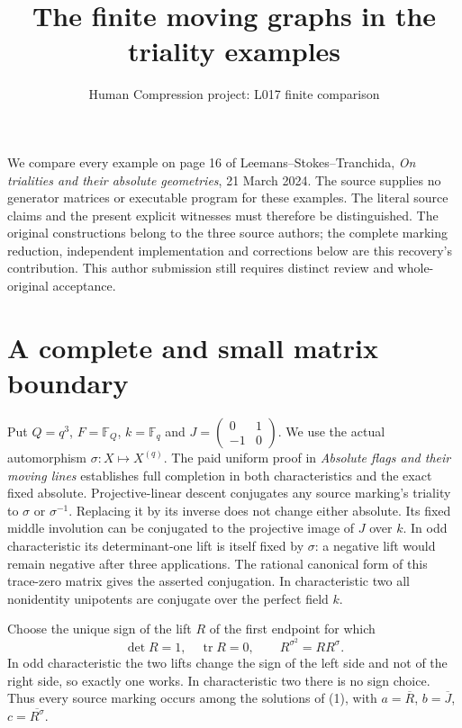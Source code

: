 \documentclass[11pt,a4paper]{article}
\title{The finite moving graphs in the triality examples}
\author{Human Compression project: L017 finite comparison}\date{}
\begin{document}
\maketitle
We compare every example on page 16 of Leemans--Stokes--Tranchida,
\emph{On trialities and their absolute geometries}, 21 March 2024.
The source supplies no generator matrices or executable program for these
examples. The literal source claims and the present explicit witnesses must
therefore be distinguished. The original constructions belong to the three
source authors; the complete marking reduction, independent implementation
and corrections below are this recovery's contribution. This author submission
still requires distinct review and whole-original acceptance.

\section{A complete and small matrix boundary}
Put $Q=q^3$, $F=\mathbb F_Q$, $k=\mathbb F_q$ and
$J=\left(\begin{smallmatrix}0&1\\-1&0\end{smallmatrix}\right)$.
We use the actual automorphism $\sigma:X\mapsto X^{(q)}$.
The paid uniform proof in \emph{Absolute flags and their moving lines}
establishes full completion in both characteristics and the exact fixed
absolute. Projective-linear descent conjugates any source marking's
triality to $\sigma$ or $\sigma^{-1}$. Replacing it by its inverse does not
change either absolute. Its fixed middle involution can be conjugated to
the projective image of $J$ over $k$. In odd characteristic its determinant-one
lift is itself fixed by $\sigma$: a negative lift would remain negative after
three applications. The rational canonical form of this trace-zero matrix
gives the asserted conjugation. In characteristic two all nonidentity
unipotents are conjugate over the perfect field $k$.

Choose the unique sign of the lift $R$ of the first endpoint for which
\[
 \det R=1,\quad \operatorname{tr}R=0,\qquad
                     R^{\sigma^2}=RR^\sigma.               \tag{1}
\]
In odd characteristic the two lifts change the sign of the left side and
not of the right side, so exactly one works. In characteristic two there
is no sign choice. Thus every source marking occurs among the solutions
of (1), with $a=\overline R$, $b=\overline J$, $c=\overline{R^\sigma}$.
\end{document}
